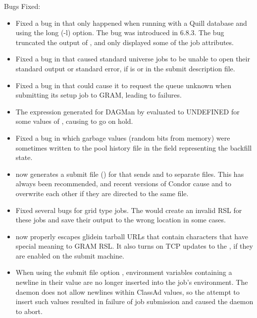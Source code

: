 \noindent Bugs Fixed:

\begin{itemize}

\item Fixed a bug in  that only happened when running 
with a Quill database and using the long (-l) option.  The bug was 
introduced in 6.8.3.  The bug truncated the output of , and
only displayed some of the job attributes.

\item Fixed a bug in  that caused standard universe jobs
to be unable to open their standard output or standard error, if
 is  or 
 in the submit description file.

\item Fixed a bug in  that could cause it to request the
queue unknown when submitting its setup job to GRAM, leading to
failures.

\item The  expression generated for DAGMan by
 evaluated to UNDEFINED for some values of
, causing  to go on hold.

\item Fixed a bug in which garbage values (random bits from memory)
were sometimes
written to the pool history file in the field representing the
backfill state.

\item {} now generates a submit file
() for  that sends  and
 to separate files.  This has always been recommended,
and recent versions of Condor cause  and  to
overwrite each other if they are directed to the same file.

\item Fixed several bugs for grid type  jobs.
The  would create an invalid RSL for these jobs
and save their output to the wrong location in some cases.

\item {} now properly escapes glidein tarball URLs that
contain characters that have special meaning to GRAM RSL. It also turns
on TCP updates to the ,
if they are enabled on the submit machine.

\item When using the submit file option ,
environment
variables containing a newline in their value are no longer inserted
into the job's environment.  The  daemon
does not allow newlines
within ClassAd values, so the attempt to insert such values resulted
in failure of job submission and caused the  daemon
to abort.


\end{itemize}

